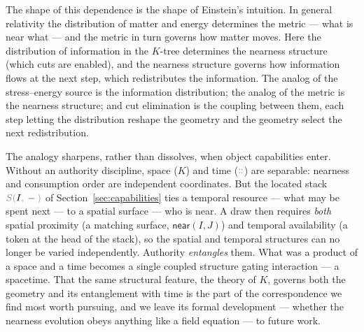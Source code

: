\documentclass[11pt]{article}
\theoremstyle{definition}
\theoremstyle{plain}
\newcommand{\dec}[1]{\textcolor{costgray}{#1}}   %
\newcommand{\near}{\mathsf{near}}
\newcommand{\lstk}[2]{\dec{S(}{#1}\dec{,}\,#2\dec{)}}  %
\newcommand{\cons}{\mathbin{\dec{\dblcolon}}}  %
\begin{document}
The shape of this dependence is the shape of Einstein's intuition. In
general relativity the distribution of matter and energy determines the
metric --- what is near what --- and the metric in turn governs how matter
moves. Here the distribution of information in the $K$-tree determines the
nearness structure (which cuts are enabled), and the nearness structure
governs how information flows at the next step, which redistributes the
information. The analog of the stress--energy source is the information
distribution; the analog of the metric is the nearness structure; and cut
elimination is the coupling between them, each step letting the
distribution reshape the geometry and the geometry select the next
redistribution.

The analogy sharpens, rather than dissolves, when object capabilities
enter. Without an authority discipline, space ($K$) and time ($\cons$) are
separable: nearness and consumption order are independent coordinates.
But the located stack $\lstk{I}{-}$ of Section~\ref{sec:capabilities} ties
a temporal resource --- what may be spent next --- to a spatial surface
--- who is near. A draw then requires \emph{both} spatial proximity (a
matching surface, $\near(I,J)$) and temporal availability (a token at the
head of the stack), so the spatial and temporal structures can no longer
be varied independently. Authority \emph{entangles} them. What was a
product of a space and a time becomes a single coupled structure gating
interaction --- a spacetime. That the same structural feature, the theory
of $K$, governs both the geometry and its entanglement with time is the
part of the correspondence we find most worth pursuing, and we leave its
formal development --- whether the nearness evolution obeys anything like a
field equation --- to future work.
\end{document}
